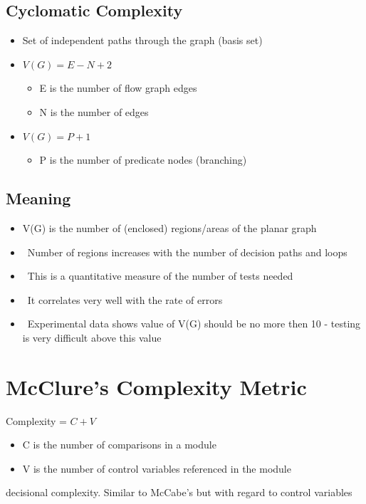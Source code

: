 \documentclass{article}
\begin{document}
\subsection{Cyclomatic Complexity}

\begin{itemize}
  \item Set	of	independent	paths	through	the	graph	(basis	set)	
  \item $V(G) = E - N + 2$
  \begin{itemize}
    \item E	is	the	number	of	flow	graph	edges
    \item N is the number of edges
  \end{itemize}
  \item $V(G)	=	P	+	1$
  \begin{itemize}
    \item  P	is	the	number	of	predicate	nodes	(branching)	
  \end{itemize}
\end{itemize}

\subsection{Meaning}

\begin{itemize}
  \item V(G)	is	the	number	of	(enclosed)	regions/areas	of	the	planar	graph	
  \item  Number	of	regions	increases	with	the	number	of	decision	paths	and	loops	
  \item  This	is	a	quantitative	measure	of	the	number	of	tests	needed		
  \item  It	correlates	very	well	with	the	rate	of	errors	
  \item  Experimental	data	shows	value	of	V(G)	should	be	no	more	then	10	-	testing	is	very	difficult	above	this	value
\end{itemize}

\section{McClure’s Complexity Metric}

\begin{flushleft}
Complexity =	$C	+	V$
\begin{itemize}
  \item  C	is	the	number	of	comparisons	in	a	module
  \item  V	is	the	number	of	control	variables	referenced	in	the	module
\end{itemize}
decisional complexity. Similar to McCabe's but with regard to control variables
\end{flushleft}
\end{document}
